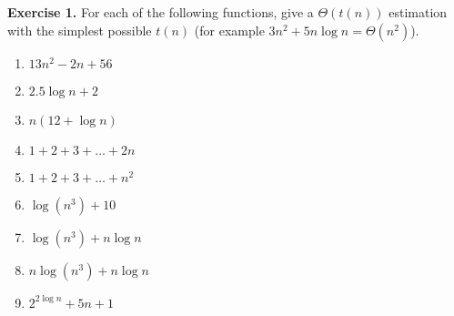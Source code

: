 \documentclass[11pt]{article}
\begin{document}
\textbf{Exercise 1.}
For each of the following functions, give a $\Theta(t(n))$ estimation with the simplest possible $t(n)$ (for example $3n^2 +5 n \log n = \Theta(n^2)$).
\begin{enumerate}
\item $13n^2 - 2n + 56$
\item $2.5 \log n + 2$
\item $n (12 + \log n)$
\item $1+2 + 3 + \ldots + 2n$
\item $1+2 + 3 + \ldots + n^2$
\item $\log (n^3) + 10$
\item $\log(n^3) + n \log n$
\item $n \log(n^3) + n \log n$
\item $2^{2 \log n} + 5n +1$
\end{enumerate}
\end{document}
